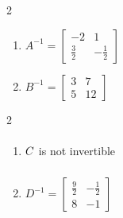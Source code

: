 \documentclass{ximera}
\begin{document}
	\author{Stitz-Zeager}




\begin{multicols}{2} 
\begin{enumerate}


\item $A^{-1} = \left[ \begin{array}{rr} -2 & 1 \\  \frac{3}{2} & -\frac{1}{2} \end{array} \right]$
\item $B^{-1} = \left[ \begin{array}{rr} 3 & 7 \\ 5 & 12 \end{array} \right]$

\setcounter{HW}{\value{enumi}}
\end{enumerate}
\end{multicols}

\begin{multicols}{2} 
\begin{enumerate}
\setcounter{enumi}{\value{HW}}

\item $C \vphantom{\left[ \begin{array}{rr} \frac{9}{2} & -\frac{1}{2} \\ 8 & -1 \end{array} \right]}$ is not invertible
\item $D^{-1} = \left[ \begin{array}{rr} \frac{9}{2} & -\frac{1}{2} \\ 8 & -1 \end{array} \right]$

\setcounter{HW}{\value{enumi}}
\end{enumerate}
\end{multicols}
\end{document}
